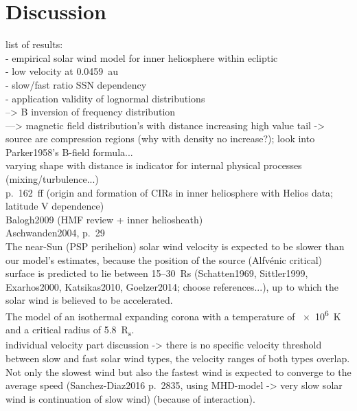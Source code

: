 


\section{Discussion}
list of results:\\
- empirical solar wind model for inner heliosphere within ecliptic\\
- low velocity at 0.0459~au\\
- slow/fast ratio SSN dependency\\
- application validity of lognormal distributions\\
--> B inversion of frequency distribution\\
---> magnetic field distribution's with distance increasing high value tail -> source are compression regions (why with density no increase?); look into Parker1958's B-field formula...\\
varying shape with distance is indicator for internal physical processes (mixing/turbulence...)\\

\citet{Balogh1999} p.~162~ff (origin and formation of CIRs in inner heliosphere with Helios data; latitude V dependence)\\
Balogh2009 (HMF review + inner heliosheath)\\
Aschwanden2004, p.~29\\

The near-Sun (PSP perihelion) solar wind velocity is expected to be slower than our model's estimates, because the position of the source (Alfvénic critical) surface is predicted to lie between 15--30~Rs (Schatten1969, Sittler1999, Exarhos2000, Katsikas2010, Goelzer2014; choose references...), up to which the solar wind is believed to be accelerated.\\
The \citet{Parker1958} model of an isothermal expanding corona with a temperature of \SI{e6}{\K} and a critical radius of \SI{5.8}{R_s}.\\

individual velocity part discussion -> there is no specific velocity threshold between slow and fast solar wind types, the velocity ranges of both types overlap.\\
Not only the slowest wind but also the fastest wind is expected to converge to the average speed (Sanchez-Diaz2016 p.~2835, using MHD-model -> very slow solar wind is continuation of slow wind) (because of interaction).\\


